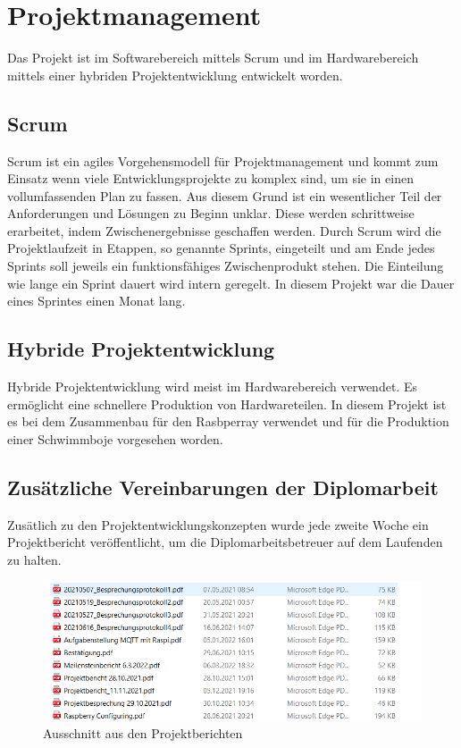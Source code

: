 



\section{Projektmanagement}
Das Projekt ist im Softwarebereich mittels Scrum und im Hardwarebereich mittels einer hybriden Projektentwicklung entwickelt worden.

\subsection{Scrum}
Scrum ist ein agiles Vorgehensmodell für Projektmanagement
und kommt zum Einsatz wenn viele Entwicklungsprojekte zu komplex sind, um sie in einen vollumfassenden Plan zu fassen.
Aus diesem Grund ist ein wesentlicher Teil der Anforderungen und Lösungen zu Beginn unklar. 
Diese werden schrittweise erarbeitet, indem Zwischenergebnisse geschaffen werden.
Durch Scrum wird die Projektlaufzeit in Etappen, so genannte Sprints, eingeteilt und
am Ende jedes Sprints soll jeweils ein funktionsfähiges Zwischenprodukt stehen.
Die Einteilung wie lange ein Sprint dauert wird intern geregelt.
In diesem Projekt war die Dauer eines Sprintes einen Monat lang.

\subsection{Hybride Projektentwicklung}
Hybride Projektentwicklung wird meist im Hardwarebereich verwendet.
Es ermöglicht eine schnellere Produktion von Hardwareteilen.
In diesem Projekt ist es bei dem Zusammenbau für den Rasbperray verwendet
und für die Produktion einer Schwimmboje vorgesehen worden.



\subsection{Zusätzliche Vereinbarungen der Diplomarbeit}
Zusätlich zu den Projektentwicklungskonzepten wurde jede zweite Woche ein Projektbericht veröffentlicht, um die Diplomarbeitsbetreuer auf dem Laufenden zu halten.

\begin{figure}[H]
    \centering
    \includegraphics[width=1\textwidth]{pics/AusschnittProjektberichte.png}
    \caption{Ausschnitt aus den Projektberichten}
\end{figure}


